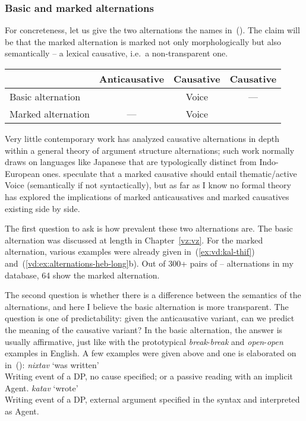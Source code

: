 		\subsubsection{Basic and marked alternations}
For concreteness, let us give the two alternations the names in~(\nextx). The claim will be that the marked alternation is marked not only morphologically but also semantically -- a lexical causative, i.e.~a non-transparent one.
\ex
\begin{tabular}{l|ccc}
	&	Anticausative & Causative & Causative\\\hline
Basic alternation	& {\vz} & Voice & ---  \\
Marked alternation		&	---	&  Voice & {\vd}\\
\end{tabular}
\xe

Very little contemporary work has analyzed causative alternations in depth within a general theory of argument structure alternations; such work normally draws on languages like Japanese \citep{jacobsen92} that are typologically distinct from Indo-European ones. \citet[62ff]{layering15} speculate that a marked causative should entail thematic/active Voice (semantically if not syntactically), but as far as I know no formal theory has explored the implications of marked anticausatives and marked causatives existing side by side.

The first question to ask is how prevalent these two alternations are. The basic alternation was discussed at length in Chapter~\ref{vz:vz}. For the marked alternation, various examples were already given in~(\ref{ex:vd:kal-thif}) and~(\ref{vd:ex:alternations-heb-long}b). Out of 300+ pairs of {\tkal}--{\thif} alternations in my database, 64 show the marked alternation.%

%
%

The second question is whether there is a difference between the semantics of the alternations, and here I believe the basic alternation is more transparent. The question is one of predictability: given the anticausative variant, can we predict the meaning of the causative variant? In the basic alternation, the answer is usually affirmative, just like with the prototypical \emph{break}-\emph{break} and \emph{open}-\emph{open} examples in English. A few examples were given  above and one is elaborated on in~(\nextx):
\pex
	\a \emph{nixtav} `was written'\\
		Writing event of a DP, no cause specified; or a passive reading with an implicit Agent.
	\a \emph{katav} `wrote'\\
		Writing event of a DP, external argument specified in the syntax and interpreted as Agent.
\xe

